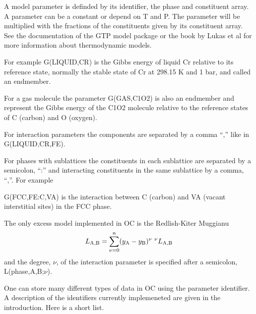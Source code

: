 \documentclass[12pt]{article}
\begin{document}
A model parameter is definded by its identifier, the phase and
constituent array.  A parameter can be a constant or depend on T and
P.  The parameter will be multiplied with the fractions of the
constituents given by its constituent array.  See the documentation of
the GTP model package or the book by Lukas et al\cite{07Luk} for more
information about thermodynamic models.

For example G(LIQUID,CR) is the Gibbs energy of liquid Cr relative to
its reference state, normally the stable state of Cr at 298.15 K and 1
bar, and called an endmember.

For a gas molecule the parameter G(GAS,C1O2) is also an endmember and
represent the Gibbs energy of the C1O2 molecule relative to the
reference states of C (carbon) and O (oxygen).

For interaction parameters the components are separated by a comma
``,'' like in G(LIQUID,CR,FE).

For phases with sublattices the constituents in each sublattice
are separated by a semicolon, ``:'' and interacting constituents in
the same sublattice by a comma, ``,''.  For example

G(FCC,FE:C,VA) is the interaction between C (carbon) and VA (vacant
interstitial sites) in the FCC phase.

The only excess model implemented in OC is the Redlish-Kiter Muggianu
\begin{eqnarray*}
L_{\rm A,B} = \sum_{\nu=0}^n (y_{\rm A} - y_{\rm B})^{\nu} ~^{\nu}L_{\rm A,B}
\end{eqnarray*}
and the degree, $\nu$, of the interaction parameter is specified after
a semicolon, L(phase,A,B;$\nu$).

One can store many different types of data in OC using the parameter
identifier.  A description of the identifiers currently implemeneted
are given in the introduction.  Here is a short list.
\end{document}
